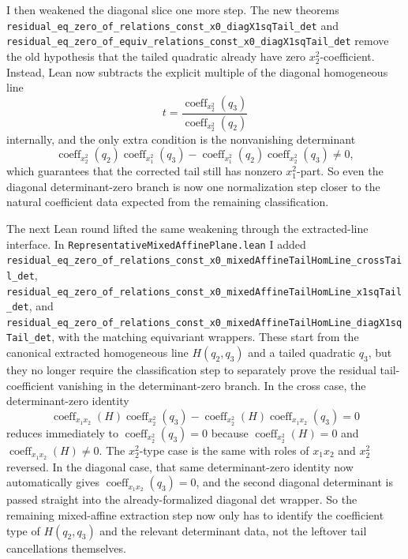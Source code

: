 \documentclass[11pt]{article}
\begin{document}
I then weakened the diagonal slice one more step. The new theorems
\texttt{residual\_eq\_zero\_of\_relations\_const\_x0\_diagX1sqTail\_det} and
\texttt{residual\_eq\_zero\_of\_equiv\_relations\_const\_x0\_diagX1sqTail\_det}
remove the old hypothesis that the tailed quadratic already have zero
\(x_2^2\)-coefficient. Instead, Lean now subtracts the explicit multiple of the
diagonal homogeneous line
\[
  t = \frac{\operatorname{coeff}_{x_2^2}(q_3)}
           {\operatorname{coeff}_{x_2^2}(q_2)}
\]
internally, and the only extra condition is the nonvanishing determinant
\[
  \operatorname{coeff}_{x_2^2}(q_2)\operatorname{coeff}_{x_1^2}(q_3)
  -
  \operatorname{coeff}_{x_1^2}(q_2)\operatorname{coeff}_{x_2^2}(q_3) \neq 0,
\]
which guarantees that the corrected tail still has nonzero \(x_1^2\)-part. So
even the diagonal determinant-zero branch is now one normalization step closer
to the natural coefficient data expected from the remaining classification.

The next Lean round lifted the same weakening through the extracted-line
interface. In \texttt{RepresentativeMixedAffinePlane.lean} I added
\texttt{residual\_eq\_zero\_of\_relations\_const\_x0\_mixedAffineTailHomLine\_crossTail\_det},
\texttt{residual\_eq\_zero\_of\_relations\_const\_x0\_mixedAffineTailHomLine\_x1sqTail\_det},
and
\texttt{residual\_eq\_zero\_of\_relations\_const\_x0\_mixedAffineTailHomLine\_diagX1sqTail\_det},
with the matching equivariant wrappers. These start from the canonical
extracted homogeneous line \(H(q_2,q_3)\) and a tailed quadratic \(q_3\), but
they no longer require the classification step to separately prove the residual
tail-coefficient vanishing in the determinant-zero branch. In the cross case,
the determinant-zero identity
\[
  \operatorname{coeff}_{x_1x_2}(H)\operatorname{coeff}_{x_2^2}(q_3)
  -
  \operatorname{coeff}_{x_2^2}(H)\operatorname{coeff}_{x_1x_2}(q_3)=0
\]
reduces immediately to \(\operatorname{coeff}_{x_2^2}(q_3)=0\) because
\(\operatorname{coeff}_{x_2^2}(H)=0\) and
\(\operatorname{coeff}_{x_1x_2}(H)\neq 0\). The \(x_2^2\)-type case is the
same with roles of \(x_1x_2\) and \(x_2^2\) reversed. In the diagonal case,
that same determinant-zero identity now automatically gives
\(\operatorname{coeff}_{x_1x_2}(q_3)=0\), and the second diagonal determinant
is passed straight into the already-formalized diagonal det wrapper. So the
remaining mixed-affine extraction step now only has to identify the coefficient
type of \(H(q_2,q_3)\) and the relevant determinant data, not the leftover
tail cancellations themselves.
\end{document}
